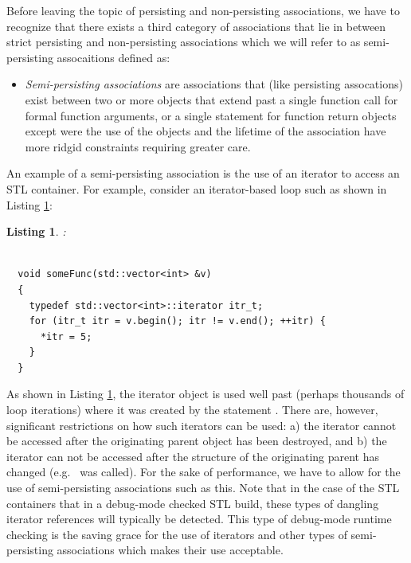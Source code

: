 \documentclass[pdf,ps2pdf,11pt]{SANDreport}
\newtheorem{listing}{Listing}
\begin{document}
Before leaving the topic of persisting and non-persisting
associations, we have to recognize that there exists a third category
of associations that lie in between strict persisting and
non-persisting associations which we will refer to as semi-persisting
assocaitions defined as:

\begin{itemize}

{}\item\textit{Semi-persisting associations} are associations that
(like persisting assocations) exist between two or more objects that
extend past a single function call for formal function arguments, or a
single statement for function return objects except were the use of
the objects and the lifetime of the association have more ridgid
constraints requiring greater care.

\end{itemize}

An example of a semi-persisting association is the use of an iterator
to access an STL container.  For example, consider an iterator-based
loop such as shown in Listing {}\ref{listing:SemiPersistingIterators}:


\begin{listing}:\\
\label{listing:SemiPersistingIterators}
{\small\begin{verbatim}

  void someFunc(std::vector<int> &v)
  {
    typedef std::vector<int>::iterator itr_t;
    for (itr_t itr = v.begin(); itr != v.end(); ++itr) {
      *itr = 5;
    }
  }
\end{verbatim}}
\end{listing}


As shown in Listing {}\ref{listing:SemiPersistingIterators}, the
iterator object {} is used well past (perhaps thousands of
loop iterations) where it was created by the statement {}.  There are, however, significant restrictions on how
such iterators can be used: a) the iterator cannot be accessed after
the originating parent object has been destroyed, and b) the iterator
can not be accessed after the structure of the originating parent has
changed (e.g.\ {} was called).  For the sake of
performance, we have to allow for the use of semi-persisting
associations such as this.  Note that in the case of the STL
containers that in a debug-mode checked STL build, these types of
dangling iterator references will typically be detected.  This type of
debug-mode runtime checking is the saving grace for the use of
iterators and other types of semi-persisting associations which makes
their use acceptable.
\end{document}
